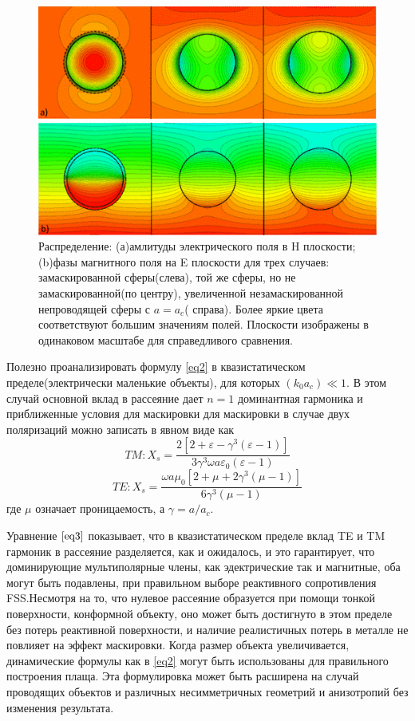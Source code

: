 \documentclass[12pt,a4paper]{article}
\begin{document}
\begin{figure}[t]
  \centering
  \includegraphics[height=0.3\paperheight, width=0.6\paperwidth]{3.png}
  \caption{Распределение: (а)амлитуды электрического поля в H плоскости;(b)фазы магнитного 
  поля на E плоскости для трех случаев: замаскированной сферы(слева), той же сферы, но не 
  замаскированной(по центру), увеличенной незамаскированной непроводящей сферы с $a=a_c$(
  справа). Более яркие цвета соответствуют большим значениям полей. Плоскости изображены в 
  одинаковом масштабе для справедливого сравнения.}
  \label{fig:3}
\end{figure}

Полезно проанализировать формулу \ref{eq2} в квазистатическом пределе(электрически маленькие 
объекты), для которых $(k_0a_c) \ll 1$. В этом случай основной вклад в рассеяние дает
$n=1$ доминантная гармоника и приближенные условия для маскировки для маскировки в 
случае двух поляризаций можно записать в явном виде как
\begin{equation*}
TM:X_s = 
\frac{2[2+\varepsilon-\gamma^3(\varepsilon-1)]}{3\gamma^3\omega a\varepsilon_0(\varepsilon-1)
}
\end{equation*}
\begin{equation}\label{eq3}
TE:X_s = \frac{\omega a\mu_0[2+\mu+2\gamma^3(\mu-1)]}{6\gamma^3(\mu-1)}
\end{equation}
где $\mu$ означает проницаемость, а $\gamma=a/a_c$.

Уравнение $\ref{eq3}$ показывает, что в квазистатическом пределе вклад TE и TM гармоник в 
рассеяние разделяется, как и ожидалось, и это гарантирует, что доминирующие мультиполярные
члены, как эдектрические так и магнитные, оба могут быть подавлены, при правильном выборе
реактивного сопротивления FSS.Несмотря на то, что нулевое рассеяние образуется при помощи 
тонкой поверхности, конформной объекту, оно может быть достигнуто в этом пределе без потерь 
реактивной поверхности, и наличие реалистичных потерь в металле не повлияет на эффект 
маскировки. Когда размер объекта увеличивается, динамические формулы как в \ref{eq2} могут
быть использованы для правильного построения плаща. Эта формулировка может быть расширена на
случай проводящих объектов и различных несимметричных геометрий и анизотропий без изменения
результата.
\end{document}
